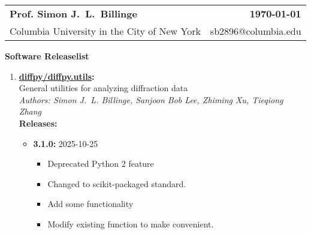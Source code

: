 \documentclass[prl,tighten,amsmath,amssymb,floatfix]{revtex4-1}
\begin{document}
\noindent
\colorbox{gray!40}{%
  \begin{tabular*}{7in}{l@{\extracolsep{\fill}}r}
  \textbf{\Large Prof. Simon J.~L.~Billinge} & \textbf{\today} \\
  Columbia University in the City of New York & sb2896@columbia.edu \\
  \end{tabular*}%
}\vspace{1em}

\textbf{Software Releaselist}


\begin{enumerate}
  \item \textbf{\href{https://github.com/diffpy/diffpy.utils}{diffpy/diffpy.utils}:}\\
  \hspace*{1em}General utilities for analyzing diffraction data\\
  \hspace*{1em}\textit{Authors: Simon J.~L. Billinge, Sanjoon Bob Lee, Zhiming Xu, Tieqiong Zhang}\\
  \hspace*{1em}\textbf{Releases:}\vspace{-0.5em}
  \begin{itemize}[label={}]
    \item \textbf{3.1.0:} 2025-10-25
      \begin{itemize}[label={}, leftmargin=2em]
        \item Deprecated Python 2 feature
        \item Changed to scikit-packaged standard.
        \item Add some functionality
        \item Modify existing function to make convenient.
      \end{itemize}
  \end{itemize}


\end{enumerate}
\end{document}
